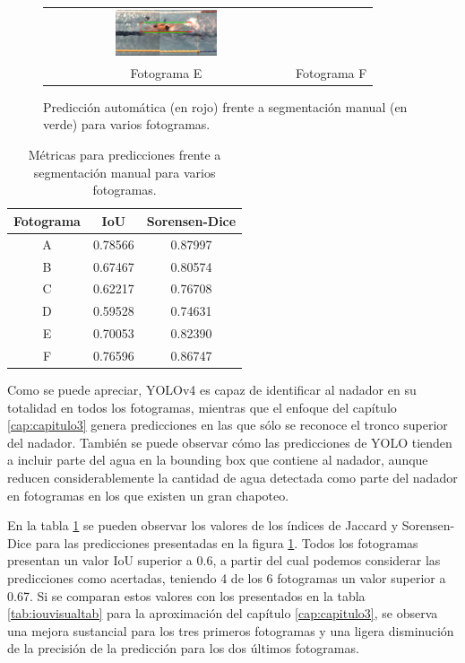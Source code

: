 \begin{figure}[h!]
\begin{tabular}{cc}
          \includegraphics[width=0.43\textwidth,height=0.43\textheight,keepaspectratio]{imagenes/parte_IA/iou_visual/1241_recortada.png}
          \\Fotograma E & Fotograma F
     \end{tabular}
     \caption{Predicción automática (en rojo) frente a segmentación manual (en verde) para varios fotogramas.}
     \label{fig:iouvisualimgsyolo}
\end{figure}

\begin{table}[]
    \centering
    \begin{tabular}{| c | c | c | } \hline
        Fotograma & IoU & Sorensen-Dice \\ \hline
        A & 0.78566 & 0.87997  \\
        B & 0.67467 & 0.80574 \\   
        C & 0.62217 & 0.76708 \\ 
        D & 0.59528 & 0.74631 \\ 
        E & 0.70053 & 0.82390 \\ 
        F & 0.76596 & 0.86747 \\ \hline
    \end{tabular}
    \caption{Métricas para predicciones frente a segmentación manual para varios fotogramas.}
    \label{tab:iouvisualtabyolo}
\end{table}

Como se puede apreciar, YOLOv4 es capaz de identificar al nadador en su totalidad en todos los fotogramas, mientras que el enfoque del capítulo \ref{cap:capitulo3} genera predicciones en las que sólo se reconoce el tronco superior del nadador. También se puede observar cómo las predicciones de YOLO tienden a incluir parte del agua en la bounding box que contiene al nadador, aunque reducen considerablemente la cantidad de agua detectada como parte del nadador en fotogramas en los que existen un gran chapoteo.

En la tabla \ref{tab:iouvisualtabyolo} se pueden observar los valores de los índices de Jaccard y Sorensen-Dice para las predicciones presentadas en la figura \ref{fig:iouvisualimgsyolo}. Todos los fotogramas presentan un valor IoU superior a 0.6, a partir del cual podemos considerar las predicciones como acertadas, teniendo 4 de los 6 fotogramas un valor superior a 0.67. Si se comparan estos valores con los presentados en la tabla \ref{tab:iouvisualtab} para la aproximación del capítulo \ref{cap:capitulo3}, se observa una mejora sustancial para los tres primeros fotogramas y una ligera disminución de la precisión de la predicción para los dos últimos fotogramas.

